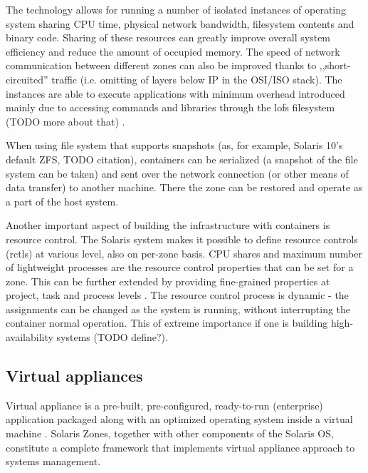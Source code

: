 \documentclass[11pt]{book}
\begin{document}
        The technology allows for running a number of isolated instances of operating system sharing CPU time,
        physical network bandwidth, filesystem contents and binary code. Sharing of these resources can greatly improve
        overall system efficiency and reduce the amount of occupied memory. The speed of network communication between
        different zones can also be improved thanks to ,,short-circuited'' traffic (i.e. omitting of layers below IP in
        the OSI/ISO stack). The instances are able to execute applications with minimum overhead introduced mainly due
        to accessing commands and libraries through the lofs filesystem (TODO more about that) \cite{price}.

        When using file system that supports snapshots (as, for example, Solaris 10's default ZFS, TODO citation), containers can be
        serialized (a snapshot of the file system can be taken) and sent over the network connection (or other means of
        data transfer) to another machine. There the zone can be restored and operate as a part of the host system.

        Another important aspect of building the infrastructure with containers is resource control. The Solaris system
        makes it possible to define resource controls (rctls) at various level, also on per-zone basis. CPU shares and
        maximum number of lightweight processes are the resource control properties that can be set for a zone. This can
        be further extended by providing fine-grained properties at project, task and process levels \cite{sag}. The
        resource control process is dynamic - the assignments can be changed as the system is running, without
        interrupting the container normal operation. This of extreme importance if one is building high-availability systems (TODO define?).



      \subsection{Virtual appliances}
      \label{sub:}

        Virtual appliance is a pre-built, pre-configured, ready-to-run (enterprise) application packaged along with an
        optimized operating system inside a virtual machine \cite{changhua}. Solaris Zones, together with other
        components of the Solaris OS, constitute a complete framework that implements virtual appliance approach to
        systems management.  %
\end{document}
